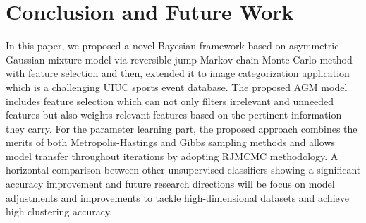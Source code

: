 \documentclass[conference]{IEEEtran}
\begin{document}



\section{Conclusion and Future Work}
In this paper, we proposed a novel Bayesian framework based on asymmetric Gaussian mixture model via reversible jump Markov chain Monte Carlo method with feature selection and then, extended it to image categorization application which is a challenging UIUC sports event database. The proposed AGM model includes feature selection which can not only filters irrelevant and unneeded features but also weights relevant features based on the pertinent information they carry. For the parameter learning part, the proposed approach combines the merits of both Metropolis-Hastings and Gibbs sampling methods and allows model transfer throughout iterations by adopting RJMCMC methodology. A horizontal comparison between other unsupervised classifiers showing a significant accuracy improvement and future research directions will be focus on model adjustments and improvements to tackle high-dimensional datasets and achieve high clustering accuracy. 
\end{document}
